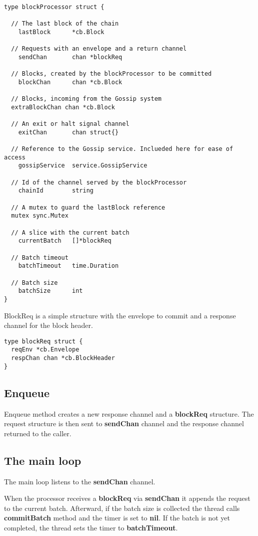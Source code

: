 \begin{lstlisting}
type blockProcessor struct {

  // The last block of the chain
	lastBlock      *cb.Block

  // Requests with an envelope and a return channel
	sendChan       chan *blockReq

  // Blocks, created by the blockProcessor to be committed
	blockChan      chan *cb.Block

  // Blocks, incoming from the Gossip system
  extraBlockChan chan *cb.Block

  // An exit or halt signal channel
	exitChan       chan struct{}

  // Reference to the Gossip service. Inclueded here for ease of access
	gossipService  service.GossipService

  // Id of the channel served by the blockProcessor
	chainId        string

  // A mutex to guard the lastBlock reference
  mutex sync.Mutex

  // A slice with the current batch
	currentBatch   []*blockReq

  // Batch timeout
	batchTimeout   time.Duration

  // Batch size
	batchSize      int
}
\end{lstlisting}

\newpage
BlockReq is a simple structure with the envelope to commit and a response channel for the block header.

\begin{lstlisting}
type blockReq struct {
  reqEnv *cb.Envelope
  respChan chan *cb.BlockHeader
}
\end{lstlisting}

\subsection*{Enqueue}

Enqueue method creates a new response channel and a \textbf{blockReq} structure. The request structure is then sent to \textbf{sendChan} channel and the response channel returned to the caller.

\subsection*{The main loop}

The main loop listens to the \textbf{sendChan} channel.

When the processor receives a \textbf{blockReq} via \textbf{sendChan} it appends the request to the current batch. Afterward, if the batch size is collected the thread calls \textbf{commitBatch} method and the timer is set to \textbf{nil}. If the batch is not yet completed, the thread sets the timer to \textbf{batchTimeout}.

